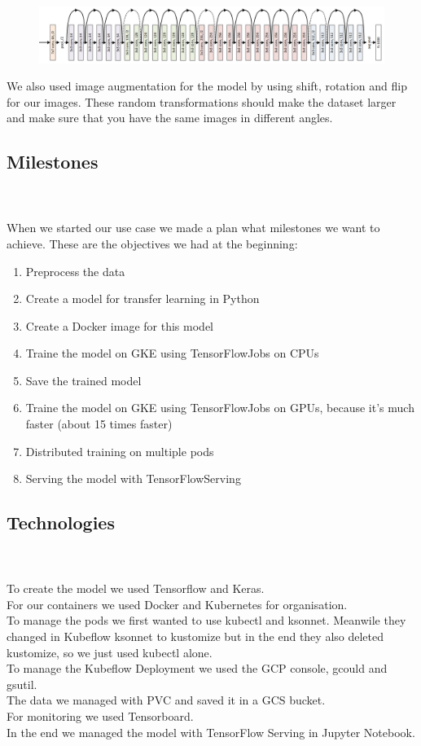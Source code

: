 \documentclass[
	12pt, %
]{fphw}
\begin{document}
\begin{figure}[H]
	\includegraphics[width=1\textwidth]{resnet.png}
\end{figure}

\noindent We also used image augmentation for the model by using shift, rotation and flip for our images. These random transformations should make the dataset larger and make sure that you have the same images in different angles.\\

\subsection*{Milestones}

\ \\  \ \\
\noindent When we started our use case we made a plan what milestones we want to achieve. These are the objectives we had at the beginning:
\begin{enumerate} 
\item Preprocess the data
\item Create a model for transfer learning in Python
\item Create a Docker image for this model
\item Traine the model on GKE using TensorFlowJobs on CPUs
\item Save the trained model
\item Traine the model on GKE using TensorFlowJobs on GPUs, because it's much faster (about 15 times faster)
\item Distributed training on multiple pods
\item Serving the model with TensorFlowServing
\end{enumerate}


\subsection*{Technologies}
\ \\ \ \\
To create the model we used Tensorflow and Keras.\\
 For our containers we used Docker and Kubernetes for organisation. \\
To manage the pods we first wanted to use kubectl and ksonnet. Meanwile they changed in Kubeflow ksonnet to kustomize but in the end they also deleted kustomize, so we just used kubectl alone.\\
 To manage the Kubeflow Deployment we used the GCP console, gcould and gsutil.\\
The data we managed with PVC and saved it in a GCS bucket. \\
 For monitoring we used Tensorboard. \\
 In the end we managed the model with TensorFlow Serving in Jupyter Notebook.
\ \\
\end{document}
